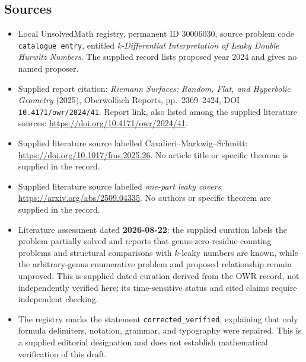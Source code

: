 \documentclass[11pt]{article}
\begin{document}
\subsection{Sources}
\begin{itemize}
\item Local UnsolvedMath registry, permanent ID \(30006030\), source problem code \texttt{catalogue entry}, entitled \emph{k-Differential Interpretation of Leaky Double Hurwitz Numbers}. The supplied record lists proposed year 2024 and gives no named proposer.
\item Supplied report citation: \emph{Riemann Surfaces: Random, Flat, and Hyperbolic Geometry} (2025), Oberwolfach Reports, pp.\ 2369--2424, DOI \texttt{10.4171/owr/2024/41}. Report link, also listed among the supplied literature sources: \url{https://doi.org/10.4171/owr/2024/41}.
\item Supplied literature source labelled Cavalieri--Markwig--Schmitt: \url{https://doi.org/10.1017/fms.2025.26}. No article title or specific theorem is supplied in the record.
\item Supplied literature source labelled \emph{one-part leaky covers}: \url{https://arxiv.org/abs/2509.04335}. No authors or specific theorem are supplied in the record.
\item Literature assessment dated \textbf{2026-08-22}: the supplied curation labels the problem partially solved and reports that genus-zero residue-counting problems and structural comparisons with \(k\)-leaky numbers are known, while the arbitrary-genus enumerative problem and proposed relationship remain unproved. This is supplied dated curation derived from the OWR record, not independently verified here; its time-sensitive status and cited claims require independent checking.
\item The registry marks the statement \texttt{corrected\_verified}, explaining that only formula delimiters, notation, grammar, and typography were repaired. This is a supplied editorial designation and does not establish mathematical verification of this draft.
\end{itemize}
\end{document}
